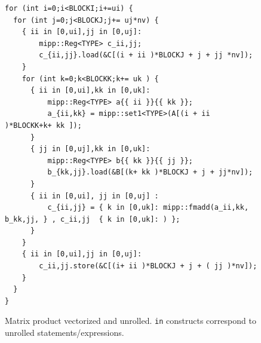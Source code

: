 \documentclass{article}
\begin{document}
\begin{figure}
  \begin{lstlisting}
for (int i=0;i<BLOCKI;i+=ui) {                
  for (int j=0;j<BLOCKJ;j+= uj*nv) {           
    { ii in [0,ui],jj in [0,uj]:
        mipp::Reg<TYPE> c_ii,jj;
        c_{ii,jj}.load(&C[(i + ii )*BLOCKJ + j + jj *nv]);
    }                
    for (int k=0;k<BLOCKK;k+= uk ) {            
      { ii in [0,ui],kk in [0,uk]:
          mipp::Reg<TYPE> a{{ ii }}{{ kk }};
          a_{ii,kk} = mipp::set1<TYPE>(A[(i + ii )*BLOCKK+k+ kk ]);
      }
      { jj in [0,uj],kk in [0,uk]:
          mipp::Reg<TYPE> b{{ kk }}{{ jj }};
          b_{kk,jj}.load(&B[(k+ kk )*BLOCKJ + j + jj*nv]);
      }    
      { ii in [0,ui], jj in [0,uj] :
          c_{ii,jj} = { k in [0,uk]: mipp::fmadd(a_ii,kk, b_kk,jj, } , c_ii,jj  { k in [0,uk]: ) };
      }
    }
    { ii in [0,ui],jj in [0,uj]:
        c_ii,jj.store(&C[(i+ ii )*BLOCKJ + j + ( jj )*nv]);      
    }
  }
}
  \end{lstlisting}
  \caption{Matrix product vectorized and unrolled\label{fig:gemm}. \texttt{in} constructs correspond to unrolled statements/expressions. }
\end{figure}
\end{document}
